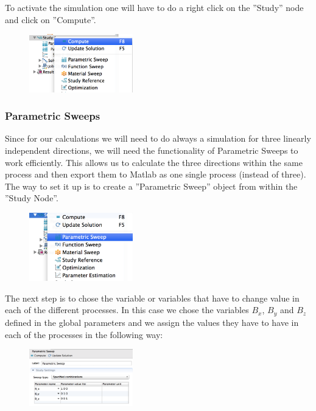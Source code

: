 To activate the simulation one will have to do a right click on the ''Study'' node and click on ''Compute''.

\begin{figure}[H]
	\centering
  \includegraphics[width=0.4\textwidth]{Pictures/Screenshots/Sim26.png}
\end{figure} 


\subsubsection{Parametric Sweeps}

Since for our calculations we will need to do always a simulation for three linearly independent directions, we will need the functionality of Parametric Sweeps to work efficiently. This allows us to calculate the three directions within the same process and then export them to Matlab as one single process (instead of three).\\

The way to set it up is to create a ''Parametric Sweep'' object from within the ''Study Node''.\\
\begin{figure}[H]
	\centering
  \includegraphics[width=0.4\textwidth]{Pictures/Screenshots/Sim27.png}
\end{figure} 

The next step is to chose the variable or variables that have to change value in each of the different processes. In this case we chose the variables $B_x$, $B_y$ and $B_z$ defined in the global parameters and we assign the values they have to have in each of the processes in the following way:\\

\begin{figure}[H]
	\centering
  \includegraphics[width=0.4\textwidth]{Pictures/Screenshots/Sim28.png}
\end{figure} 

